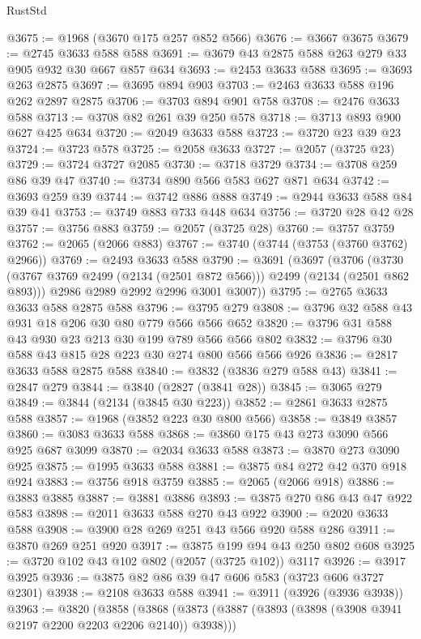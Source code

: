 \begin{lexlean}{RustStd}
\begin{coremodule}
@3675 := @1968 (@3670 @175 @257 @852 @566)
@3676 := @3667 @3675
@3679 := @2745 @3633 @588 @588
@3691 := @3679 @43 @2875 @588 @263 @279 @33 @905 @932 @30 @667 @857 @634
@3693 := @2453 @3633 @588
@3695 := @3693 @263 @2875
@3697 := @3695 @894 @903
@3703 := @2463 @3633 @588 @196 @262 @2897 @2875
@3706 := @3703 @894 @901 @758
@3708 := @2476 @3633 @588
@3713 := @3708 @82 @261 @39 @250 @578
@3718 := @3713 @893 @900 @627 @425 @634
@3720 := @2049 @3633 @588
@3723 := @3720 @23 @39 @23
@3724 := @3723 @578
@3725 := @2058 @3633
@3727 := @2057 (@3725 @23)
@3729 := @3724 @3727 @2085
@3730 := @3718 @3729
@3734 := @3708 @259 @86 @39 @47
@3740 := @3734 @890 @566 @583 @627 @871 @634
@3742 := @3693 @259 @39
@3744 := @3742 @886 @888
@3749 := @2944 @3633 @588 @84 @39 @41
@3753 := @3749 @883 @733 @448 @634
@3756 := @3720 @28 @42 @28
@3757 := @3756 @883
@3759 := @2057 (@3725 @28)
@3760 := @3757 @3759
@3762 := @2065 (@2066 @883)
@3767 := @3740 (@3744 (@3753 (@3760 @3762) @2966))
@3769 := @2493 @3633 @588
@3790 := @3691
    (@3697
      (@3706
        (@3730 (@3767 @3769 @2499 (@2134 (@2501 @872 @566))) @2499 (@2134 (@2501 @862 @893)))
        @2986
        @2989
        @2992
        @2996
        @3001
        @3007))
@3795 := @2765 @3633 @3633 @588 @2875 @588
@3796 := @3795 @279
@3808 := @3796 @32 @588 @43 @931 @18 @206 @30 @80 @779 @566 @566 @652
@3820 := @3796 @31 @588 @43 @930 @23 @213 @30 @199 @789 @566 @566 @802
@3832 := @3796 @30 @588 @43 @815 @28 @223 @30 @274 @800 @566 @566 @926
@3836 := @2817 @3633 @588 @2875 @588
@3840 := @3832 (@3836 @279 @588 @43)
@3841 := @2847 @279
@3844 := @3840 (@2827 (@3841 @28))
@3845 := @3065 @279
@3849 := @3844 (@2134 (@3845 @30 @223))
@3852 := @2861 @3633 @2875 @588
@3857 := @1968 (@3852 @223 @30 @800 @566)
@3858 := @3849 @3857
@3860 := @3083 @3633 @588
@3868 := @3860 @175 @43 @273 @3090 @566 @925 @687 @3099
@3870 := @2034 @3633 @588
@3873 := @3870 @273 @3090 @925
@3875 := @1995 @3633 @588
@3881 := @3875 @84 @272 @42 @370 @918 @924
@3883 := @3756 @918 @3759
@3885 := @2065 (@2066 @918)
@3886 := @3883 @3885
@3887 := @3881 @3886
@3893 := @3875 @270 @86 @43 @47 @922 @583
@3898 := @2011 @3633 @588 @270 @43 @922
@3900 := @2020 @3633 @588
@3908 := @3900 @28 @269 @251 @43 @566 @920 @588 @286
@3911 := @3870 @269 @251 @920
@3917 := @3875 @199 @94 @43 @250 @802 @608
@3925 := @3720 @102 @43 @102 @802 (@2057 (@3725 @102)) @3117
@3926 := @3917 @3925
@3936 := @3875 @82 @86 @39 @47 @606 @583 (@3723 @606 @3727 @2301)
@3938 := @2108 @3633 @588
@3941 := @3911 (@3926 (@3936 @3938))
@3963 := @3820
    (@3858
      (@3868
        (@3873 (@3887 (@3893 (@3898 (@3908 @3941 @2197 @2200 @2203 @2206 @2140)) @3938)))

\end{coremodule}
\end{lexlean}
